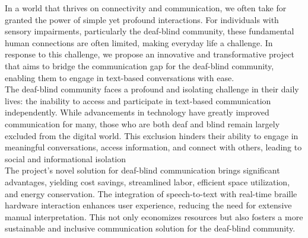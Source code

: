 \documentclass[12pt,a4paper]{report}
\begin{document}
\begin{justify}
    In a world that thrives on connectivity and communication, we often take for granted
the power of simple yet profound interactions. For individuals with sensory impairments, particularly the deaf-blind community, these fundamental human connections are often limited, making everyday life a challenge. In response to this challenge, we propose an innovative and transformative project that aims to bridge the communication gap for the deaf-blind community, enabling them to engage in text-based conversations with ease.\\

\noindent The deaf-blind community faces a profound and isolating challenge in their daily lives: the inability to access and participate in text-based communication independently. While advancements in technology have greatly improved communication for many, those who are both deaf and blind remain largely excluded from the digital world. This exclusion hinders their ability to engage in meaningful conversations, access information, and connect with others, leading to social and informational isolation \\

\noindent The project's novel solution for deaf-blind communication brings significant advantages, yielding cost savings, streamlined labor, efficient space utilization, and energy conservation. The integration of speech-to-text with real-time braille hardware interaction enhances user experience, reducing the need for extensive manual interpretation. This not only economizes resources but also fosters a more sustainable and inclusive communication solution for the deaf-blind community.
\end{justify}

\renewcommand{\contentsname}{\centering Table of Contents}
\tableofcontents

\newpage
\listoftables

\listoffigures








\fancyhf{} %
\fancyfoot[R]{\thepage} %
\renewcommand{\headrule}{%
  {\color[RGB]{97, 35, 34}\hrule width\headwidth height 2pt} %
  \vspace{0.07\baselineskip}%
  {\color[RGB]{97, 35, 34}\hrule width\headwidth height 0.5pt} %
}
\renewcommand{\footrule}{%
  
  {\color[RGB]{97, 35, 34}\hrule width\headwidth height 0.5pt} %
  \vspace{0.07\baselineskip}%
  {\color[RGB]{97, 35, 34}\hrule width\headwidth height 2pt} %
}
\end{document}
